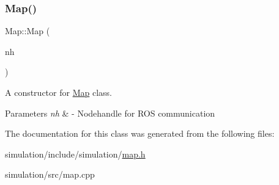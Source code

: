 \subsubsection{\texorpdfstring{Map()}{Map()}}
{\footnotesize\ttfamily Map\+::\+Map (\begin{DoxyParamCaption}\item[{ros\+::\+Node\+Handle \&}]{nh }\end{DoxyParamCaption})}



A constructor for \hyperlink{classMap}{Map} class. 


\begin{DoxyParams}{Parameters}
{\em nh} & -\/ Nodehandle for R\+OS communication \\
\hline
\end{DoxyParams}


The documentation for this class was generated from the following files\+:\begin{DoxyCompactItemize}
\item 
simulation/include/simulation/\hyperlink{map_8h}{map.\+h}\item 
simulation/src/map.\+cpp\end{DoxyCompactItemize}
